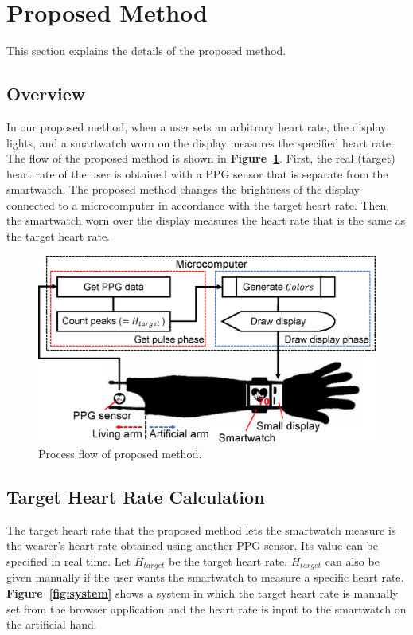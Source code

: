 \documentclass[sigchi,authordraft]{acmart}
\newcommand\figref[1]{\textbf{Figure~\ref{fig:#1}}}
\begin{document}
\section{Proposed Method}
\label{sec:method}
This section explains the details of the proposed method.

\subsection{Overview}
\label{subsec:overview}
In our proposed method, when a user sets an arbitrary heart rate, the display lights, and a smartwatch worn on the display measures the specified heart rate. The flow of the proposed method is shown in \figref{method}. First, the real (target) heart rate of the user is obtained with a PPG sensor that is separate from the smartwatch. The proposed method changes the brightness of the display connected to a microcomputer in accordance with the target heart rate. Then, the smartwatch worn over the display measures the heart rate that is the same as the target heart rate.

\begin{figure}[!t]
  \centering
  \includegraphics[width=0.75\linewidth]{figures/method.eps}
  \caption{Process flow of proposed method.}
  \label{fig:method}
\end{figure}


\subsection{Target Heart Rate Calculation}
The target heart rate that the proposed method lets the smartwatch measure is the wearer's heart rate obtained using another PPG sensor. Its value can be specified in real time. Let $H_{target}$ be the target heart rate. $H_{target}$ can also be given manually if the user wants the smartwatch to measure a specific heart rate. \figref{system} shows a system in which the target heart rate is manually set from the browser application and the heart rate is input to the smartwatch on the artificial hand.
\end{document}
